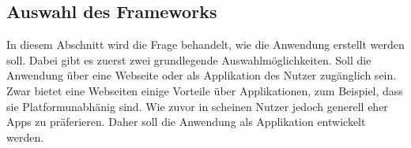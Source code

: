 \subsection{Auswahl des Frameworks}\label{subsection:auswahlDesFrameworks}
In diesem Abschnitt wird die Frage behandelt, wie die Anwendung erstellt werden soll.
Dabei gibt es zuerst zwei grundlegende Auswahlmöglichkeiten. Soll die Anwendung über eine Webseite oder als Applikation des Nutzer zugänglich sein.
	Zwar bietet eine Webseiten einige Vorteile über Applikationen, zum Beispiel, dass sie Platformunabhänig sind. Wie zuvor in  scheinen Nutzer jedoch generell eher Apps zu präferieren\cite{pcVsphone_mobileAppVsWebTimeSpent}.
	Daher soll die Anwendung als Applikation entwickelt werden.

